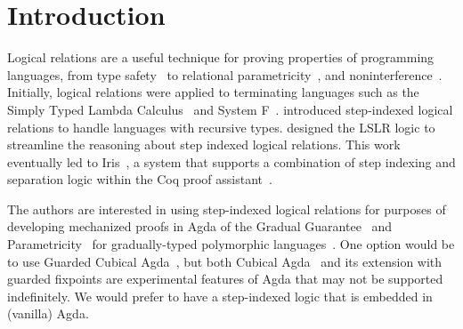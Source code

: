 \documentclass[acmsmall]{acmart}
\begin{document}



\maketitle


\clearpage

\tableofcontents

\section{Introduction}
\label{sec:intro}

Logical relations are a useful technique for proving properties of
programming languages, from type safety~\citep{Timany:2022aa} to
relational parametricity~\citep{REYNOLDS83}, and
noninterference~\citep{heintze1998slam}.  Initially, logical relations
were applied to terminating languages such as the Simply Typed Lambda
Calculus~\citep{Tait:1967aa} and System F~\citep{GIRARD72}.
\citet{Appel:2001aa} introduced step-indexed logical relations to
handle languages with recursive types.  \citet{Dreyer:2011wl} designed
the LSLR logic to streamline the reasoning about step indexed logical
relations.  This work eventually led to Iris~\citep{JUNG:2018aa}, a
system that supports a combination of step indexing and separation
logic within the Coq proof
assistant~\citep{The-Coq-Development-Team:2004kf,Huet:2016aa}.

The authors are interested in using step-indexed logical relations for
purposes of developing mechanized proofs in Agda of the Gradual
Guarantee~\citep{Siek:2015ac} and Parametricity~\citep{REYNOLDS74C}
for gradually-typed polymorphic
languages~\citep{Ahmed:2011fk,Ahmed:2017aa,Igarashi:2017aa,New:2019ab,Labrada:2020tk}. One
option would be to use Guarded Cubical Agda~\citep{Veltri:2020aa}, but
both Cubical Agda~\citep{Vezzosi:2019aa} and its extension with
guarded fixpoints are experimental features of Agda that may not be
supported indefinitely.  We would prefer to have a step-indexed logic
that is embedded in (vanilla) Agda.
\end{document}
